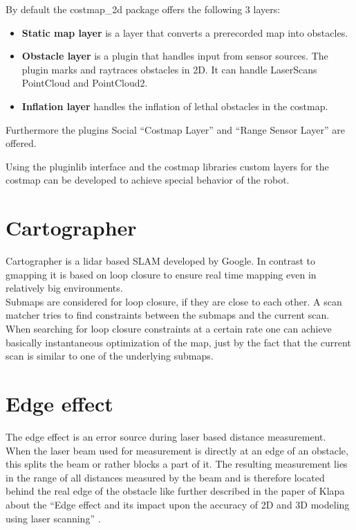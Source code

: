 By default the costmap\_2d package offers the following 3 layers:
\begin{itemize}
	\item \textbf{Static map layer} is a layer that converts a prerecorded map into obstacles.
	\item  \textbf{Obstacle layer} is a plugin that handles input from sensor sources. The plugin marks and raytraces obstacles in 2D. It can handle LaserScans PointCloud and PointCloud2.
	\item \textbf{Inflation layer} handles the inflation of lethal obstacles in the costmap.
\end{itemize}

Furthermore the plugins Social ``Costmap Layer'' and ``Range Sensor Layer'' are offered.

Using the pluginlib interface and the costmap libraries custom layers for the costmap can be developed to achieve special behavior of the robot.



\section{Cartographer}
Cartographer is a lidar based SLAM developed by Google. In contrast to gmapping it is based on loop closure to ensure real time mapping even in relatively big environments.\\
Submaps are considered for loop closure, if they are close to each other. A scan matcher tries to find constraints between the submaps and the current scan. When searching for loop closure constraints at a certain rate one can achieve basically instantaneous optimization of the map, just by the fact that the current scan is similar to one of the underlying submaps\cite{cartographer}.\\

\section{Edge effect}

The edge effect is an error source during laser based distance measurement.
When the laser beam used for measurement is directly at an edge of an obstacle, this splits the beam or rather blocks a part of it. The resulting measurement lies in the range of all distances measured by the beam and is therefore located behind the real edge of the obstacle like further described in the paper of Klapa about the ``Edge effect and its impact upon the accuracy of 2D and 3D modeling using laser scanning'' \cite{edgeeffect}.\\


